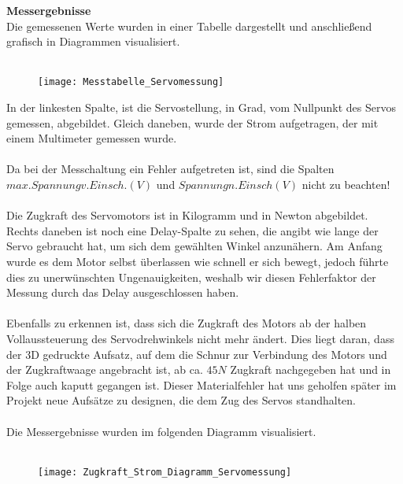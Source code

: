 \documentclass[titlepage,12pt,twoside]{article}
\begin{document}
\hfill \break
\textbf{Messergebnisse}\\
Die gemessenen Werte wurden in einer Tabelle dargestellt und anschließend grafisch in Diagrammen visualisiert. \\
\\
\begin{figure}[H]
	\begin{center}
		\scalebox{1.3}
		{\texttt{[image: Messtabelle\_Servomessung]}}
	\end{center}
\end{figure}
\hfill \break
In der linkesten Spalte, ist die Servostellung, in Grad, vom Nullpunkt des Servos gemessen, abgebildet. Gleich daneben, wurde 
der Strom aufgetragen, der mit einem Multimeter gemessen wurde. \\
\\
Da bei der Messchaltung ein Fehler aufgetreten ist, sind die Spalten $max. Spannung v. Einsch. (V)$ und $Spannung n. Einsch(V)$
nicht zu beachten! \\
\\
Die Zugkraft des Servomotors ist in Kilogramm und in Newton abgebildet. Rechts daneben ist noch eine Delay-Spalte zu sehen, die
angibt wie lange der Servo gebraucht hat, um sich dem gewählten Winkel anzunähern. Am Anfang wurde es dem Motor selbst überlassen
wie schnell er sich bewegt, jedoch führte dies zu unerwünschten Ungenauigkeiten, weshalb wir diesen Fehlerfaktor der Messung durch 
das Delay ausgeschlossen haben. \\
\\
Ebenfalls zu erkennen ist, dass sich die Zugkraft des Motors ab der halben Vollaussteuerung des Servodrehwinkels nicht mehr ändert.
Dies liegt daran, dass der 3D gedruckte Aufsatz, auf dem die Schnur zur Verbindung des Motors und der Zugkraftwaage angebracht ist,
ab ca. $45N$ Zugkraft nachgegeben hat und in Folge auch kaputt gegangen ist. Dieser Materialfehler hat uns geholfen später im
Projekt neue Aufsätze zu designen, die dem Zug des Servos standhalten. \\
\\
Die Messergebnisse wurden im folgenden Diagramm visualisiert. \\
\\
\begin{figure}[H]
	\begin{center}
		\scalebox{1.2}
		{\texttt{[image: Zugkraft\_Strom\_Diagramm\_Servomessung]}}
	\end{center}
\end{figure}
\end{document}
